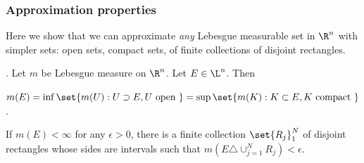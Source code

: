 \documentclass{article} %
\begin{document}
\subsubsection{Approximation properties}

Here we show that we can approximate \textit{any} Lebesgue measurable set in $\R^n$ with simpler sets: open sets, compact sets, of finite collections of disjoint rectangles. 

\begin{theorem}\cite[Thm 2.40a,c]{folland1999real}.
Let $m$ be Lebesgue measure on $\R^n$.  Let $E \in \L^n$.  Then 
\begin{alphabate}
\item $m(E) = \inf \set{m(U) : U \supset E, U \text{ open }} = \sup \set{m(K) : K \subset E, K \text{ compact }}$.
\item If $m(E) < \infty$ for any $\epsilon > 0$, there is a finite collection $\set{R_j}_{1}^N$ of disjoint rectangles whose sides are intervals such that $m(E \triangle  \cup_{j=1}^N R_j) < \epsilon$.  
\end{alphabate}
\end{theorem}
\end{document}

